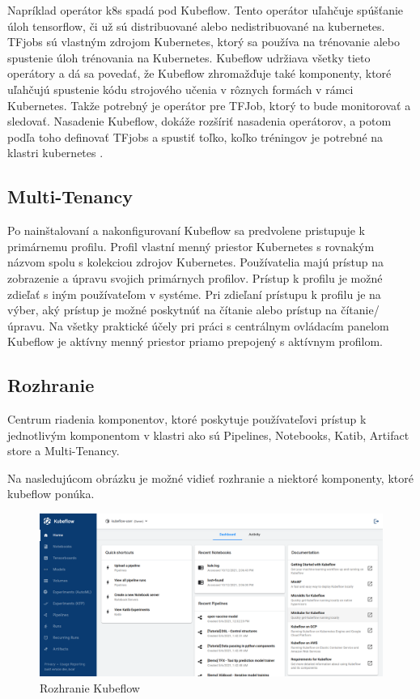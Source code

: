 Napríklad operátor k8s spadá pod Kubeflow. Tento operátor uľahčuje spúšťanie úloh tensorflow, či už sú distribuované alebo nedistribuované na kubernetes. TFjobs sú vlastným zdrojom Kubernetes, ktorý sa používa na trénovanie alebo spustenie úloh trénovania na Kubernetes. Kubeflow udržiava všetky tieto operátory a dá sa povedať, že Kubeflow zhromažďuje také komponenty, ktoré uľahčujú spustenie kódu strojového učenia v rôznych formách v rámci Kubernetes. Takže potrebný je operátor pre TFJob, ktorý to bude monitorovať a sledovať. Nasadenie Kubeflow, dokáže rozšíriť nasadenia operátorov, a potom podľa toho definovať TFjobs a spustiť toľko, koľko tréningov je potrebné na klastri kubernetes \cite{operator}.

\subsection*{Multi-Tenancy}

Po nainštalovaní a nakonfigurovaní Kubeflow sa predvolene pristupuje k primárnemu profilu. Profil vlastní menný priestor Kubernetes s rovnakým názvom spolu s kolekciou zdrojov Kubernetes. Používatelia majú prístup na zobrazenie a úpravu svojich primárnych profilov. Prístup k profilu je možné zdieľať s iným používateľom v systéme. Pri zdieľaní prístupu k profilu je na výber, aký prístup je možné poskytnúť na čítanie alebo prístup na čítanie/úpravu. Na všetky praktické účely pri práci s centrálnym ovládacím panelom Kubeflow je aktívny menný priestor priamo prepojený s aktívnym profilom.

\subsection*{Rozhranie}

Centrum riadenia komponentov, ktoré poskytuje používateľovi prístup k jednotlivým komponentom v klastri ako sú Pipelines, Notebooks, Katib, Artifact store a Multi-Tenancy.

Na nasledujúcom obrázku je možné vidieť rozhranie a niektoré komponenty, ktoré kubeflow ponúka.

\clearpage

\begin{figure}[!h]
    \centering
    \includegraphics[width=1\linewidth]{figures/Rozhranie}
    \caption{Rozhranie Kubeflow}
\end{figure}


